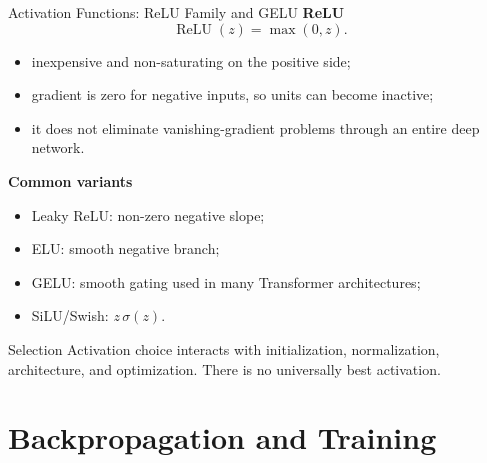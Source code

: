 \documentclass[aspectratio=169]{beamer}
\begin{document}
\begin{frame}{Activation Functions: ReLU Family and GELU}
\textbf{ReLU}
\[
  \operatorname{ReLU}(z)=\max(0,z).
\]
\begin{itemize}
  \item inexpensive and non-saturating on the positive side;
  \item gradient is zero for negative inputs, so units can become inactive;
  \item it does not eliminate vanishing-gradient problems through an entire deep network.
\end{itemize}

\textbf{Common variants}
\begin{itemize}
  \item Leaky ReLU: non-zero negative slope;
  \item ELU: smooth negative branch;
  \item GELU: smooth gating used in many Transformer architectures;
  \item SiLU/Swish: $z\,\sigma(z)$.
\end{itemize}

\begin{alertblock}{Selection}
Activation choice interacts with initialization, normalization, architecture, and optimization. There is no universally best activation.
\end{alertblock}
\end{frame}

\section{Backpropagation and Training}
\end{document}
